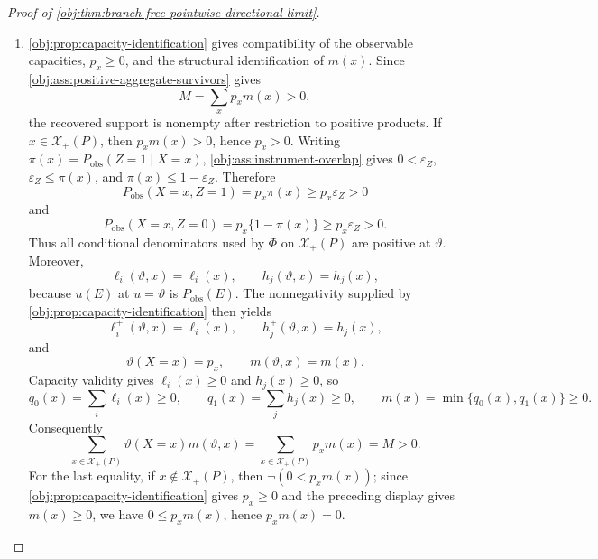 \documentclass[11pt]{article}
\begin{document}
\begin{proof}[Proof of \cref{obj:thm:branch-free-pointwise-directional-limit}]
\begin{enumerate}
\item \cref{obj:prop:capacity-identification} gives compatibility of the observable capacities, \(p_x\ge0\), and the structural identification of \(m(x)\). Since \cref{obj:ass:positive-aggregate-survivors} gives
\[
M=\sum_x p_xm(x)>0,
\]
the recovered support is nonempty after restriction to positive products. If \(x\in\mathcal X_+(P)\), then \(p_xm(x)>0\), hence \(p_x>0\). Writing \(\pi(x)=P_{\mathrm{obs}}(Z=1\mid X=x)\), \cref{obj:ass:instrument-overlap} gives \(0<\varepsilon_Z\), \(\varepsilon_Z\le \pi(x)\), and \(\pi(x)\le 1-\varepsilon_Z\). Therefore
\[
P_{\mathrm{obs}}(X=x,Z=1)=p_x\pi(x)\ge p_x\varepsilon_Z>0
\]
and
\[
P_{\mathrm{obs}}(X=x,Z=0)=p_x\{1-\pi(x)\}\ge p_x\varepsilon_Z>0 .
\]
Thus all conditional denominators used by \(\Phi\) on \(\mathcal X_+(P)\) are positive at \(\vartheta\). Moreover,
\[
\ell_i(\vartheta,x)=\ell_i(x),\qquad h_j(\vartheta,x)=h_j(x),
\]
because \(u(E)\) at \(u=\vartheta\) is \(P_{\mathrm{obs}}(E)\). The nonnegativity supplied by \cref{obj:prop:capacity-identification} then yields
\[
\ell_i^+(\vartheta,x)=\ell_i(x),\qquad h_j^+(\vartheta,x)=h_j(x),
\]
and
\[
\vartheta(X=x)=p_x,\qquad m(\vartheta,x)=m(x).
\]
Capacity validity gives \(\ell_i(x)\ge0\) and \(h_j(x)\ge0\), so
\[
q_0(x)=\sum_i\ell_i(x)\ge0,
\qquad
q_1(x)=\sum_jh_j(x)\ge0,
\qquad
m(x)=\min\{q_0(x),q_1(x)\}\ge0 .
\]
Consequently
\[
\sum_{x\in\mathcal X_+(P)}\vartheta(X=x)m(\vartheta,x)
=
\sum_{x\in\mathcal X_+(P)}p_xm(x)
=
M>0 .
\]
For the last equality, if \(x\notin\mathcal X_+(P)\), then \(\neg(0<p_xm(x))\); since \cref{obj:prop:capacity-identification} gives \(p_x\ge0\) and the preceding display gives \(m(x)\ge0\), we have \(0\le p_xm(x)\), hence \(p_xm(x)=0\). %


\end{enumerate}
\end{proof}
\end{document}
